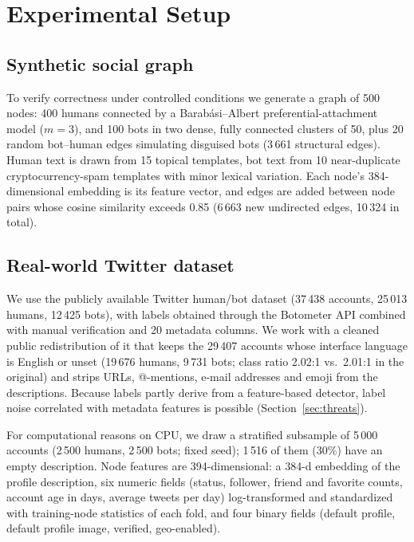 \documentclass[conference]{IEEEtran}
\begin{document}
\section{Experimental Setup}

\subsection{Synthetic social graph}
To verify correctness under controlled conditions we generate a graph of 500 nodes: 400 humans connected by a Barab\'asi--Albert preferential-attachment model ($m=3$), and 100 bots in two dense, fully connected clusters of 50, plus 20 random bot--human edges simulating disguised bots (3\,661 structural edges). Human text is drawn from 15 topical templates, bot text from 10 near-duplicate cryptocurrency-spam templates with minor lexical variation. Each node's 384-dimensional embedding is its feature vector, and edges are added between node pairs whose cosine similarity exceeds 0.85 (6\,663 new undirected edges, 10\,324 in total).

\subsection{Real-world Twitter dataset}
We use the publicly available Twitter human/bot dataset \cite{gutierrez2021twitter} (37\,438 accounts, 25\,013 humans, 12\,425 bots), with labels obtained through the Botometer API combined with manual verification and 20 metadata columns. We work with a cleaned public redistribution of it \cite{botani2024} that keeps the 29\,407 accounts whose interface language is English or unset (19\,676 humans, 9\,731 bots; class ratio 2.02:1 vs.\ 2.01:1 in the original) and strips URLs, @-mentions, e-mail addresses and emoji from the descriptions. Because labels partly derive from a feature-based detector, label noise correlated with metadata features is possible (Section~\ref{sec:threats}).

For computational reasons on CPU, we draw a stratified subsample of 5\,000 accounts (2\,500 humans, 2\,500 bots; fixed seed); 1\,516 of them (30\%) have an empty description. Node features are 394-dimensional: a 384-d embedding of the profile description, six numeric fields (status, follower, friend and favorite counts, account age in days, average tweets per day) log-transformed and standardized with training-node statistics of each fold, and four binary fields (default profile, default profile image, verified, geo-enabled).
\end{document}
